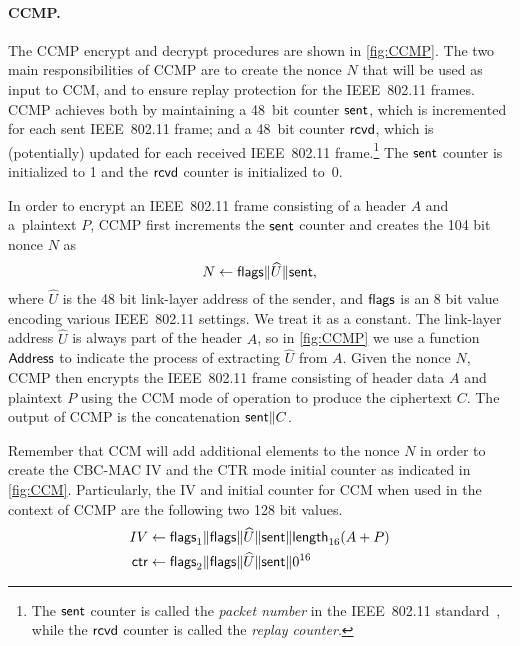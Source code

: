 \paragraph{CCMP.}
The CCMP encrypt and decrypt procedures are shown in \cref{fig:CCMP}.
The two main responsibilities of CCMP are to create the nonce $N$ that will be used as input to CCM,
and to ensure replay protection for the IEEE~802.11 frames.
CCMP achieves both by maintaining a 48~bit counter $\mathsf{sent}$,
which is incremented for each sent IEEE~802.11 frame;
and a 48~bit counter $\mathsf{rcvd}$,
which is (potentially) updated for each received IEEE~802.11 frame.\footnote{The
$\mathsf{sent}$ counter is called the \emph{packet number} in the IEEE~802.11 standard~\cite{IEEE:2012:802.11},
while the $\mathsf{rcvd}$ counter is called the \emph{replay counter}.
}
The $\mathsf{sent}$ counter is initialized to 1 and the $\mathsf{rcvd}$ counter is initialized to~0.




In order to encrypt an IEEE~802.11 frame consisting of a header $A$ and a~plaintext $P$,
CCMP first increments the $\mathsf{sent}$ counter and creates the 104 bit nonce $N$ as
\begin{equation}\label{eq:802.11:CCMP:nonce_creation}
	N \gets \mathsf{flags} \| \widehat{U} \| \mathsf{sent} ,
\end{equation}
where $\widehat{U}$ is the 48 bit link-layer address of the sender,
and $\mathsf{flags}$ is an 8 bit value encoding various IEEE~802.11 settings.
We treat it as a constant.
The link-layer address $\widehat{U}$ is always part of the header $A$,
so in \cref{fig:CCMP} we use a function $\mathsf{Address}$ to indicate the process of extracting $\widehat{U}$ from $A$.
Given the nonce $N$,
CCMP then encrypts the IEEE~802.11 frame consisting of header data $A$ and plaintext $P$ using the CCM mode of operation to produce the ciphertext $C$.
The output of CCMP is the concatenation $\mathsf{sent} \| C$.

Remember that CCM will add additional elements to the nonce $N$ in order to create the CBC-MAC IV and the CTR mode initial counter as indicated in \cref{fig:CCM}.
Particularly,
the IV and initial counter for CCM when used in the context of CCMP are the following two 128 bit values.
\begin{align}
	IV &\gets \mathsf{flags}_1 \| \mathsf{flags} \| \widehat{U} \| \mathsf{sent} \| \mathsf{length}_{16}(A + P) \\
	\mathsf{ctr} &\gets \mathsf{flags}_2 \| \mathsf{flags} \| \widehat{U} \| \mathsf{sent} \| 0^{16}
\end{align}

